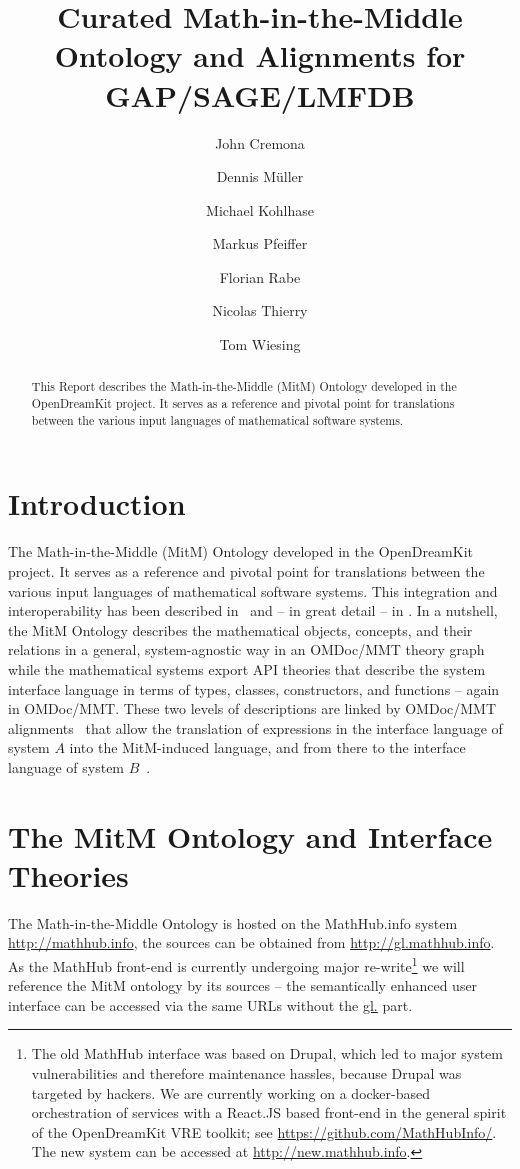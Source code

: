 \documentclass[book]{deliverablereport}
\title{Curated Math-in-the-Middle Ontology and Alignments for GAP/SAGE/LMFDB}
\author{John Cremona}
\author{Dennis M\"uller}
\author{Michael Kohlhase}
\author{Markus Pfeiffer}
\author{Florian Rabe}
\author{Nicolas Thierry}
\author{Tom Wiesing}
\begin{document}
\begin{abstract}
  This Report describes the Math-in-the-Middle (MitM) Ontology developed in the
  OpenDreamKit project. It serves as a reference and pivotal point for translations
  between the various input languages of mathematical software systems. 
\end{abstract}
\maketitle
\newpage\tableofcontents\newpage

\section{Introduction}
The Math-in-the-Middle (MitM) Ontology developed in the OpenDreamKit project. It serves as
a reference and pivotal point for translations between the various input languages of
mathematical software systems. This integration and interoperability has been described
in~\cite{DehKohKon:iop16,WieKohRab:vtuimkb17,KohMuePfe:kbimss17} and -- in great detail --
in \cite{ODK-D6.5}. In a nutshell, the MitM Ontology describes the mathematical objects,
concepts, and their relations in a general, system-agnostic way in an OMDoc/MMT theory
graph while the mathematical systems export API theories that describe the system
interface language in terms of types, classes, constructors, and functions -- again in
OMDoc/MMT. These two levels of descriptions are linked by OMDoc/MMT
alignments~\cite{MueGauKal:cacfms17} that allow the translation of expressions in the
interface language of system $A$ into the MitM-induced language, and from there to the
interface language of system $B$~\cite{MueRoYuRa:abtafs17}.

\section{The MitM Ontology and Interface Theories}
The Math-in-the-Middle Ontology is hosted on the MathHub.info system
\url{http://mathhub.info}, the sources can be obtained from
\url{http://gl.mathhub.info}. As the MathHub front-end is currently undergoing major
re-write\footnote{The old MathHub interface was based on Drupal, which led to major system
  vulnerabilities and therefore maintenance hassles, because Drupal was targeted by
  hackers. We are currently working on a docker-based orchestration of services with a
  React.JS based front-end in the general spirit of the OpenDreamKit VRE toolkit; see
  \url{https://github.com/MathHubInfo/}. The new system can be accessed at
  \url{http://new.mathhub.info}.} we will reference the MitM ontology by its sources --
the semantically enhanced user interface can be accessed via the same URLs without the
\url{gl.} part.
\end{document}
